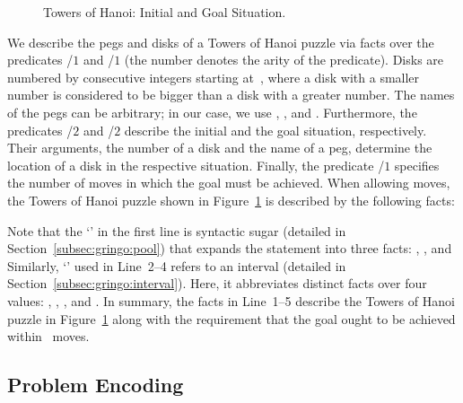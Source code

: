 \begin{figure}[tb]
\centering
\hanoiInstance
\caption{Towers of Hanoi: Initial and Goal Situation.\label{fig:toh_inst}}
\end{figure}
We describe the pegs and disks of a Towers of Hanoi puzzle via facts over the predicates
/$1$ and /$1$ (the number denotes the arity of the predicate).
Disks are numbered by consecutive integers starting at~,
where a disk with a smaller number is considered to be bigger than a disk with a greater number.
The names of the pegs can be arbitrary; in our case, we use , , and . 
Furthermore, the predicates /$2$ and /$2$ describe the initial
and the goal situation, respectively.
Their arguments, the number of a disk and the name of a peg,
determine the location of a disk in the respective situation.
Finally, the predicate /$1$ specifies the number of moves 
in which the goal must be achieved.
When allowing  moves,
the Towers of Hanoi puzzle shown in Figure~\ref{fig:toh_inst}
is described by the following facts:%
%
%

%
Note that the `\code{;}' in the first line is syntactic sugar
(detailed in Section~\ref{subsec:gringo:pool})
that expands the statement into three facts:
, , and 
Similarly, `' used in Line~2--4
refers to an interval (detailed in Section~\ref{subsec:gringo:interval}).
Here, it abbreviates distinct facts over four values:
, , , and .
In summary, the facts in Line~1--5 describe the 
Towers of Hanoi puzzle in Figure~\ref{fig:toh_inst} along
with the requirement that the goal ought to be achieved within~ moves.

\subsection{Problem Encoding}

